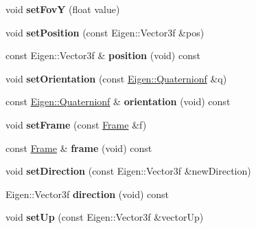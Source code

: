 \begin{DoxyCompactItemize}
\mbox{\label{class_camera_af65bcf0c1ccc9df655c453f34d3c7e2c}} 
void {\bfseries set\+FovY} (float value)
\item 
\mbox{\label{class_camera_a96515ee1c016f5e94a80c4808a6111b1}} 
void {\bfseries set\+Position} (const Eigen\+::\+Vector3f \&pos)
\item 
\mbox{\label{class_camera_ac5e39b63430bbcdc52d42e7c69374efe}} 
const Eigen\+::\+Vector3f \& {\bfseries position} (void) const
\item 
\mbox{\label{class_camera_abcdafc0aeba359632ecef5bf07bbfa4c}} 
void {\bfseries set\+Orientation} (const \hyperlink{group___geometry___module_ga785b13a5a87f9bf55d4eba51ead2dcf0}{Eigen\+::\+Quaternionf} \&q)
\item 
\mbox{\label{class_camera_a87dcab091782b992386fc0fa30d77f46}} 
const \hyperlink{group___geometry___module_ga785b13a5a87f9bf55d4eba51ead2dcf0}{Eigen\+::\+Quaternionf} \& {\bfseries orientation} (void) const
\item 
\mbox{\label{class_camera_a4530ee56805bc5cdd73f2f9bb6cf7a60}} 
void {\bfseries set\+Frame} (const \hyperlink{class_frame}{Frame} \&f)
\item 
\mbox{\label{class_camera_ab03a6fbb5d510bdf99da94654115c773}} 
const \hyperlink{class_frame}{Frame} \& {\bfseries frame} (void) const
\item 
\mbox{\label{class_camera_af8621940fefd60a60df8a02093458960}} 
void {\bfseries set\+Direction} (const Eigen\+::\+Vector3f \&new\+Direction)
\item 
\mbox{\label{class_camera_aae4b943f1e8d26086029abdd6c13b148}} 
Eigen\+::\+Vector3f {\bfseries direction} (void) const
\item 
\mbox{\label{class_camera_a37d3cc83aae74054afd31be57eee5f15}} 
void {\bfseries set\+Up} (const Eigen\+::\+Vector3f \&vector\+Up)
\item 
\mbox{\label{class_camera_add6d9b9e43330142bcb339068c271ff9}} 

\end{DoxyCompactItemize}

